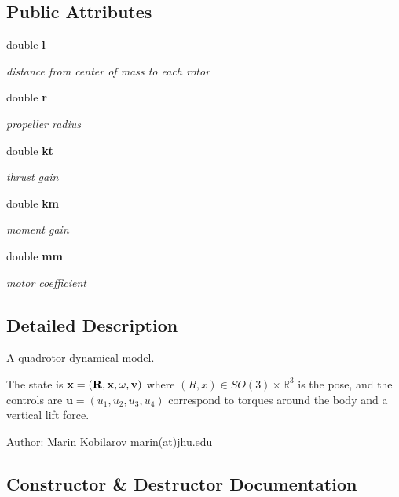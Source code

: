 \subsection*{\-Public \-Attributes}
\begin{DoxyCompactItemize}
\item 
double {\bf l}
\begin{DoxyCompactList}\small\item\em distance from center of mass to each rotor \end{DoxyCompactList}\item 
double {\bf r}
\begin{DoxyCompactList}\small\item\em propeller radius \end{DoxyCompactList}\item 
double {\bf kt}
\begin{DoxyCompactList}\small\item\em thrust gain \end{DoxyCompactList}\item 
double {\bf km}
\begin{DoxyCompactList}\small\item\em moment gain \end{DoxyCompactList}\item 
double {\bf mm}
\begin{DoxyCompactList}\small\item\em motor coefficient \end{DoxyCompactList}\end{DoxyCompactItemize}


\subsection{\-Detailed \-Description}
\-A quadrotor dynamical model.

\-The state is $ \bf x = (R, x, \omega, v) $ where $ (R,x)\in SO(3)\times\mathbb{R}^3$ is the pose, and the controls are $ \bm u = (u_1,u_2,u_3,u_4)$ correspond to torques around the body and a vertical lift force.

\-Author\-: \-Marin \-Kobilarov marin(at)jhu.\-edu 

\subsection{\-Constructor \& \-Destructor \-Documentation}
